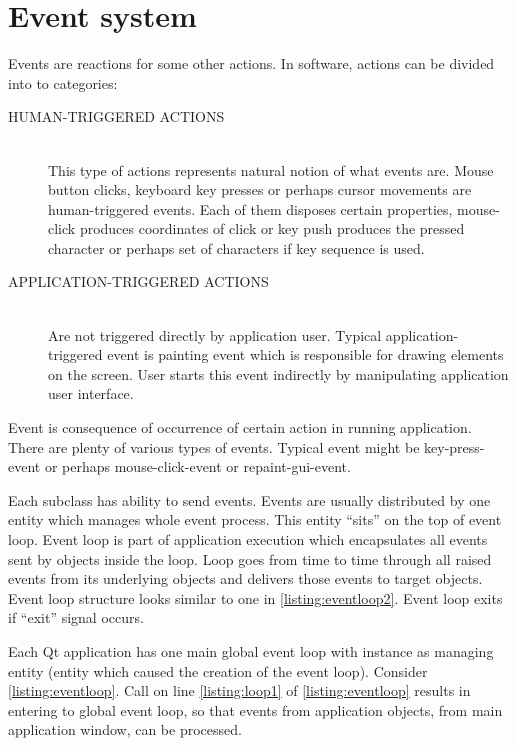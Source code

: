 \chapter{Event system}\label{section:events}
Events are reactions for some other actions. In software, actions can be divided into to categories:
\begin{description}
\item[HUMAN-TRIGGERED ACTIONS] \hfill \\
This type of actions represents natural notion of what events are. Mouse button clicks, keyboard key presses or perhaps cursor movements are human-triggered events. Each of them disposes certain properties, \eg mouse-click produces coordinates of click or key push produces the pressed character or perhaps set of characters if key sequence is used.
\item[APPLICATION-TRIGGERED ACTIONS]  \hfill \\
Are not triggered directly by application user. Typical application-triggered event is painting event which is responsible for drawing  elements on the screen. User starts this event indirectly by manipulating application user interface.
\end{description}

Event is consequence of occurrence of certain action in running application. There are plenty of various types of events. Typical event might be key-press-event or perhaps mouse-click-event or repaint-gui-event.

Each subclass has ability to send events. Events are usually distributed by one entity which manages whole event process. This entity \enquote{sits} on the top of event loop. Event loop is part of application execution which encapsulates all events sent by objects inside the loop. Loop goes from time to time through all raised events from its underlying objects and delivers those events to target objects. Event loop structure looks similar to one in \autoref{listing:eventloop2}. Event loop exits if \enquote{exit} signal occurs.

Each Qt application has one main global event loop with instance as managing entity (entity which caused the creation of the event loop). Consider \autoref{listing:eventloop}. Call on line \ref{listing:loop1} of \autoref{listing:eventloop} results in entering to global event loop, so that events from application objects, \eg from main application window, can be processed.


